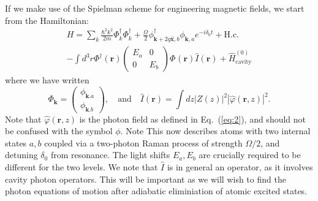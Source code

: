 \documentclass[twocolumn]{revtex4-1}
\renewcommand{\vec}[1]{\mathbf{#1}}
\begin{document}
If we make use of the Spielman scheme for engineering magnetic fields, we
start from the Hamiltonian:
\begin{multline}
  \label{eq:14}
  H = \sum_k \frac{\hbar^2 k^2}{2m} \Phi^\dagger_k \Phi^\dagger_k
  + \frac{\Omega}{2} 
  \phi^\dagger_{\vec{k} + 2 q \hat{\vec{x}},b} \phi^{}_{\vec{k}, a}e^{-i\delta_0 t}
  + \text{H.c.}
  \\
  - \int d^3r \Phi^\dagger(\vec{r}) 
  \begin{pmatrix}
    E_a & 0 \\ 0 & E_b 
  \end{pmatrix}
  \Phi^{}(\vec{r}) 
  \hat{I}(\vec{r})
  + \hat{H}^{(0)}_{\text{cavity}}
\end{multline}
where we have written
\begin{displaymath}
  \Phi_{\vec{k}} = 
  \begin{pmatrix}
    \phi^{}_{\vec{k}.a} \\ \phi^{}_{\vec{k}.b}
  \end{pmatrix},
  \quad \text{and} \quad
  \hat{I}(\vec{r}) = \int dz |Z(z)|^2 |\hat{\varphi}(\vec r, z)|^2.
\end{displaymath}
Note that $\hat{\varphi}(\vec{r},z)$ is the photon field as defined in
Eq.~(\ref{eq:2}), and should not be confused with the symbol $\phi$.
Note 
This now describes atoms with two internal states $a,b$ coupled via a
two-photon Raman process of strength $\Omega/2$, and detuning
$\delta_0$ from resonance.  The light shifts $E_a,E_b$ are crucially
required to be different for the two levels.  We note that $\hat{I}$
is in general an operator, as it involves cavity photon operators.
This will be important as we will wish to find the photon equations of
motion after adiabatic eliminiation of atomic excited states.
\end{document}
